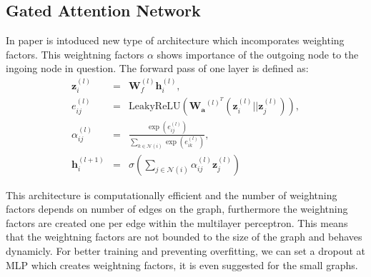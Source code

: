 \subsection{Gated Attention Network}
In paper \cite{gat} is intoduced new type of architecture which incomporates weighting factors. This weightning factors $\alpha$ shows importance of the outgoing node  to the  ingoing node in question.
The forward pass of one layer is defined as:
\begin{eqnarray}
\mathbf{z}_i^{(l)}&=&\mathbf{W}_f^{(l)}\mathbf{h}_i^{(l)}, \\
e_{ij}^{(l)}&=&\text{LeakyReLU}(\mathbf{W_a}^{(l)^T}(\mathbf{z}_i^{(l)}||\mathbf{z}_j^{(l)})),\\
\alpha_{ij}^{(l)}&=&\frac{\exp(e_{ij}^{(l)})}{\sum_{k\in \mathcal{N}(i)}^{}\exp(e_{ik}^{(l)})},\\
\mathbf{h}_i^{(l+1)}&=&\sigma\left(\sum_{j\in \mathcal{N}(i)} {\alpha^{(l)}_{ij} \mathbf{z}^{(l)}_j }\right)
\end{eqnarray}

This architecture is computationally efficient and the number of weightning factors depends on number of edges on the graph, furthermore the weightning factors are created one per edge within the multilayer perceptron. This means that the weightning factors are not bounded to the size of the graph and behaves dynamicly. %
For better training and preventing overfitting, we can set a dropout at MLP which creates weightning factors\cite{att}, it is even suggested for  the small graphs.












